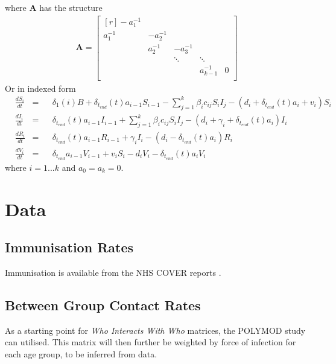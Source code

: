 \documentclass{article}
\theoremstyle{definition}
\begin{document}
  where $\mathbf{A}$ has the structure
\begin{gather*}
\mathbf{A}=\begin{bmatrix}[r]
 -a_1^{-1} &            &           &              &   \\
  a_1^{-1} &  -a_2^{-1} &           &              &   \\
           &  a_2^{-1}  & -a_3^{-1} &              &   \\
           &            & \ddots    & \ddots       &   \\
           &            &		        & a_{k-1}^{-1} & 0 \\
\end{bmatrix}
\end{gather*}
Or in indexed form
\begin{align*}
  &\frac{dS_{i}}{dt}&=&&\delta_1(i)B + \delta_{t_{end}}(t)a_{i-1}S_{i-1}-\sum_{j=1}^{k}\beta_{i}c_{ij}S_{i}I_{j}-(d_{i} + \delta_{t_{end}}(t)a_{i} + v_{i})S_{i}\\
  &\frac{dI_{i}}{dt} &=&&\delta_{t_{end}}(t)a_{i-1}I_{i-1}+\sum_{j=1}^{k}\beta_{i}c_{ij}S_{i}I_{j}-(d_{i}+\gamma_{i}+\delta_{t_{end}}(t)a_{i})I_{i}\\
  &\frac{dR_{i}}{dt} &=&& \delta_{t_{end}}(t)a_{i-1}R_{i-1}+\gamma_{i}I_{i}-(d_{i}-\delta_{t_{end}}(t)a_{i})R_{i}\\
  &\frac{dV_{i}}{dt} &=&& \delta_{t_{end}}a_{i-1}V_{i-1}+v_iS_i-d_{i}V_{i}-\delta_{t_{end}}(t)a_{i}V_{i}
\end{align*}
where $i=1...k$ and $a_0 = a_k = 0$.
\section{Data}
\subsection{Immunisation Rates}
Immunisation is available from the NHS COVER reports \cite{noauthor_childhood_nodate}.
\subsection{Between Group Contact Rates}
As a starting point for \emph{Who Interacts With Who} matrices, the POLYMOD study \cite{mossong_social_2008} can utilised. This matrix will then further be weighted by force of infection for each age group, to be inferred from data.
\end{document}
